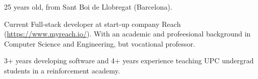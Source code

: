

\begin{cvparagraph}


25 years old, from Sant Boi de Llobregat (Barcelona).

Current Full-stack developer at start-up company Reach (\href{https://www.myreach.io/}{https://www.myreach.io/}). With an academic and profeesional background in Computer Science and Engineering, but vocational professor.

3+ years developing software and 4+ years experience teaching UPC undergrad students in a reinforcement academy.

\end{cvparagraph}
